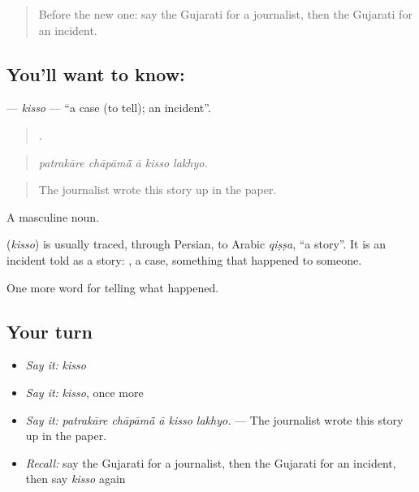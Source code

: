 \label{lesson:GU-C312-kisso}



\begin{quote}
Before the new one: say the Gujarati for a journalist, then the Gujarati for an incident.
\end{quote}

\subsection*{You'll want to know: }
\textbf{} — \emph{kisso} — \textquotedblleft{}a case (to tell); an incident\textquotedblright{}.

\begin{quote}
    .
\end{quote}

\begin{quote}
\emph{patrakāre chāpāmā̃ ā kisso lakhyo.}
\end{quote}

\begin{quote}
The journalist wrote this story up in the paper.
\end{quote}

A masculine noun.

\begin{cousinweb}
\textbf{} (\emph{kisso}) is usually traced, through Persian, to Arabic \emph{qiṣṣa}, \textquotedblleft{}a story\textquotedblright{}. It is an incident told as a story: \textbf{ }, a case, something that happened to someone.
\end{cousinweb}

\begin{grammarlens}[title={What you've built}]
One more word for telling what happened.
\end{grammarlens}

\subsection*{Your turn}
\begin{itemize}
\raggedright
  \item \emph{Say it:} \emph{kisso}
  \item \emph{Say it:} \emph{kisso}, once more
  \item \emph{Say it:} \emph{patrakāre chāpāmā̃ ā kisso lakhyo.} — The journalist wrote this story up in the paper.
  \item \emph{Recall:} say the Gujarati for a journalist, then the Gujarati for an incident, then say \emph{kisso} again
\end{itemize}

